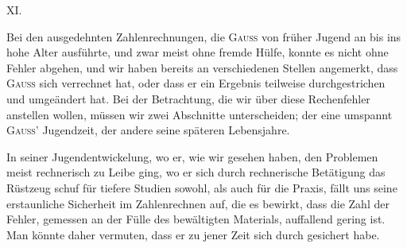 \clearpage\begingroup{}
\renewcommand{\thefootnote}{\arabic{footnote})}\setcounter{footnote}{1}
\newcommand{\MSecondsComma}{\mathord{\overset{\scriptscriptstyle\prime\prime}{,}}}
\begin{center}XI.\\[3pt]\end{center}
\noindent\hspace*{\parindent}Bei den ausgedehnten Zahlenrechnungen, die \textsc{Gauss} von früher Jugend
an bis ins hohe Alter ausführte, und zwar meist ohne fremde Hülfe, konnte
es nicht ohne Fehler abgehen, und wir haben bereits an verschiedenen Stellen
angemerkt, dass \textsc{Gauss} sich verrechnet hat, oder dass er ein Ergebnis teilweise
durchgestrichen und umgeändert hat. Bei der Betrachtung, die wir über diese
Rechenfehler anstellen wollen, müssen wir zwei Abschnitte unterscheiden;
der eine umspannt \textsc{Gauss}’ Jugendzeit, der andere seine späteren Lebensjahre.

In seiner Jugendentwickelung, wo er, wie wir gesehen haben, den Problemen meist rechnerisch zu Leibe ging, wo er sich durch rechnerische Betätigung das Rüstzeug schuf für tiefere Studien sowohl, als auch für die Praxis,
fällt uns seine erstaunliche Sicherheit im Zahlenrechnen auf, die es bewirkt,
dass die Zahl der Fehler, gemessen an der Fülle des bewältigten Materials,
auffallend gering ist. Man könnte daher vermuten, dass er zu jener Zeit sich
durch  gesichert habe.

